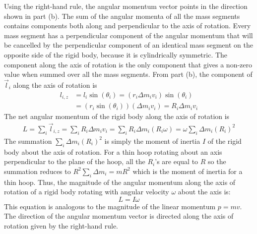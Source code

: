 \documentclass[a4paper]{article}
\begin{document}
Using the right-hand rule, the angular momentum vector points in the direction shown in part (b). The sum of the angular momenta of all the mass segments contains components both along and perpendicular to the axis of rotation. Every mass segment has a perpendicular component of the angular momentum that will be cancelled by the perpendicular component of an identical mass segment on the opposite side of the rigid body, because it is cylindrically symmetric. The component along the axis of rotation is the only component that gives a non-zero value when summed over all the mass segments. From part (b), the component of $\vec{l}_i$ along the axis of rotation is
\begin{align*}
    l_{i,z} &= l_i\sin(\theta_i) = (r_i\Delta m_iv_i)\sin(\theta_i)\\
    &= (r_i\sin(\theta_i))(\Delta m_iv_i) = R_i\Delta m_iv_i
\end{align*}
The net angular momentum of the rigid body along the axis of rotation is 
\begin{align*}
    L = \sum_{i}\vec{l}_{i,z} = \sum_{i}R_i\Delta m_iv_i = \sum_{i}R_i\Delta m_i(R_i\omega) = \omega\sum_{i}\Delta m_i(R_i)^2
\end{align*}
The summation $\sum\limits_{i}\Delta m_i(R_i)^2$ is simply the moment of inertia $I$ of the rigid body about the axis of rotation. For a thin hoop rotating about an axis perpendicular to the plane of the hoop, all the $R_i$'s are equal to $R$ so the summation reduces to $R^2\sum\limits_{i}\Delta m_i = mR^2$ which is the moment of inertia for a thin hoop. Thus, the magnitude of the angular momentum along the axis of rotation of a rigid body rotating with angular velocity $\omega$ about the axis is:
\begin{equation}
    L = I\omega
\end{equation}
This equation is analogous to the magnitude of the linear momentum $p = mv$. The direction of the angular momentum vector is directed along the axis of rotation given by the right-hand rule.
\newpage
\end{document}
